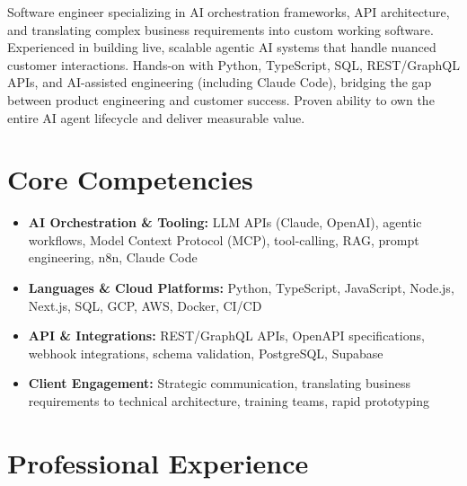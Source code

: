 \documentclass[11pt,a4paper,sans]{moderncv}
\begin{document}
\makecvtitle

\vspace{-15pt}
Software engineer specializing in AI orchestration frameworks, API architecture, and translating complex business requirements into custom working software. Experienced in building live, scalable agentic AI systems that handle nuanced customer interactions. Hands-on with Python, TypeScript, SQL, REST/GraphQL APIs, and AI-assisted engineering (including Claude Code), bridging the gap between product engineering and customer success. Proven ability to own the entire AI agent lifecycle and deliver measurable value.

\section{Core Competencies}
\vspace{1pt}
\begin{itemize}
\item \textbf{AI Orchestration \& Tooling:} LLM APIs (Claude, OpenAI), agentic workflows, Model Context Protocol (MCP), tool-calling, RAG, prompt engineering, n8n, Claude Code
\item \textbf{Languages \& Cloud Platforms:} Python, TypeScript, JavaScript, Node.js, Next.js, SQL, GCP, AWS, Docker, CI/CD
\item \textbf{API \& Integrations:} REST/GraphQL APIs, OpenAPI specifications, webhook integrations, schema validation, PostgreSQL, Supabase
\item \textbf{Client Engagement:} Strategic communication, translating business requirements to technical architecture, training teams, rapid prototyping
\end{itemize}

\section{Professional Experience}
\vspace{1pt}
\end{document}
